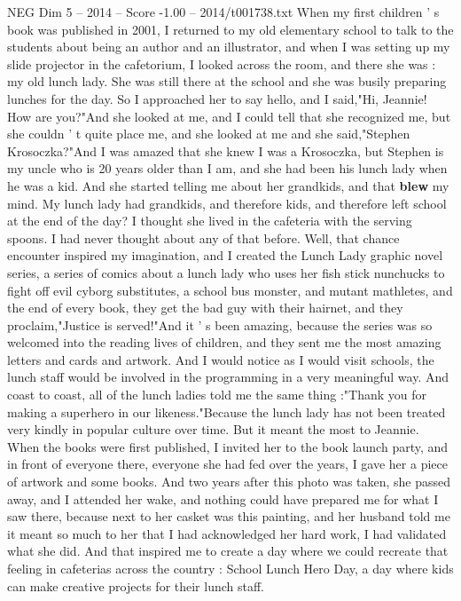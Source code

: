 \begin{textsample}{NEG Dim 5 – 2014 – Score -1.00 – 2014/t001738.txt}  \label{ex:f5_neg_039}
When my first children ' s book was published in 2001, I returned to my old elementary school to talk to the students about being an author and an illustrator, and when I was setting up my slide projector in the cafetorium, I looked across the room, and there she was : my old lunch lady.
She was still there at the school and she was busily preparing lunches for the day.
So I approached her to say hello, and I said,"Hi, Jeannie!
How are you?"And she looked at me, and I could tell that she recognized me, but she couldn ' t quite place me, and she looked at me and she said,"Stephen Krosoczka?"And I was amazed that she knew I was a Krosoczka, but Stephen is my uncle who is 20 years older than I am, and she had been his lunch lady when he was a kid.
And she started telling me about her grandkids, and that \textbf{blew} my mind.
My lunch lady had grandkids, and therefore kids, and therefore left school at the end of the day?
I thought she lived in the cafeteria with the serving spoons.
I had never thought about any of that before.
Well, that chance encounter inspired my imagination, and I created the Lunch Lady graphic novel series, a series of comics about a lunch lady who uses her fish stick nunchucks to fight off evil cyborg substitutes, a school bus monster, and mutant mathletes, and the end of every book, they get the bad guy with their hairnet, and they proclaim,"Justice is served!"And it ' s been amazing, because the series was so welcomed into the reading lives of children, and they sent me the most amazing letters and cards and artwork.
And I would notice as I would visit schools, the lunch staff would be involved in the programming in a very meaningful way.
And coast to coast, all of the lunch ladies told me the same thing :"Thank you for making a superhero in our likeness."Because the lunch lady has not been treated very kindly in popular culture over time.
But it meant the most to Jeannie.
When the books were first published, I invited her to the book launch party, and in front of everyone there, everyone she had fed over the years, I gave her a piece of artwork and some books.
And two years after this photo was taken, she passed away, and I attended her wake, and nothing could have prepared me for what I saw there, because next to her casket was this painting, and her husband told me it meant so much to her that I had acknowledged her hard work, I had validated what she did.
And that inspired me to create a day where we could recreate that feeling in cafeterias across the country : School Lunch Hero Day, a day where kids can make creative projects for their lunch staff.

\end{textsample}
